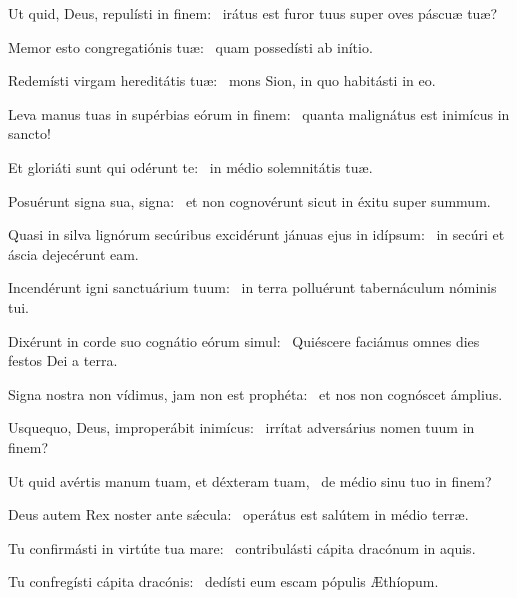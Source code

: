 \item Ut quid, Deus, repulísti in finem:~\psstar{} irátus est furor tuus super oves páscuæ tuæ?

\item Memor esto congregatiónis tuæ:~\psstar{} quam possedísti ab inítio.

\item Redemísti virgam hereditátis tuæ:~\psstar{} mons Sion, in quo habitásti in eo.

\item Leva manus tuas in supérbias eórum in finem:~\psstar{} quanta malignátus est inimícus in sancto!

\item Et gloriáti sunt qui odérunt te:~\psstar{} in médio solemnitátis tuæ.

\item Posuérunt signa sua, signa:~\psstar{} et non cognovérunt sicut in éxitu super summum.

\item Quasi in silva lignórum secúribus excidérunt jánuas ejus in idípsum:~\psstar{} in secúri et áscia dejecérunt eam.

\item Incendérunt igni sanctuárium tuum:~\psstar{} in terra polluérunt tabernáculum nóminis tui.

\item Dixérunt in corde suo cognátio eórum simul:~\psstar{} Quiéscere faciámus omnes dies festos Dei a terra.

\item Signa nostra non vídimus, jam non est prophéta:~\psstar{} et nos non cognóscet ámplius.

\item Usquequo, Deus, improperábit inimícus:~\psstar{} irrítat adversárius nomen tuum in finem?

\item Ut quid avértis manum tuam, et déxteram tuam,~\psstar{} de médio sinu tuo in finem?

\item Deus autem Rex noster ante sǽcula:~\psstar{} operátus est salútem in médio terræ.

\item Tu confirmásti in virtúte tua mare:~\psstar{} contribulásti cápita dracónum in aquis.

\item Tu confregísti cápita dra\-có\-nis:~\psstar{} dedísti eum escam pópulis Æthíopum.


